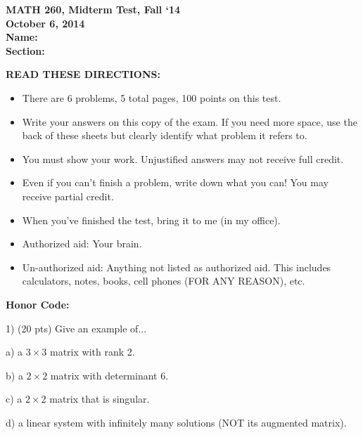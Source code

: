 \documentclass{article}
\begin{document}
\begin{flushleft}
	\bfseries{MATH 260, Midterm Test, Fall `14}\\
	\bfseries{October 6, 2014}\\
	\vspace{0.5in}
	\bfseries{Name:}\\
	\vspace{0.2in}
	\bfseries{Section:}\\
	\vspace{.5in}
	
	\bfseries{READ THESE DIRECTIONS:}
	\begin{itemize}
		\item{There are 6 problems, 5 total pages, 100 points on this test.}
		\item{Write your answers on this copy of the exam.   If you need more space, use the back of these sheets but clearly identify what problem it refers to.}
		\item{You must show your work.  Unjustified answers may not receive full credit.}
		\item{Even if you can't finish a problem, write down what you can!  You may receive partial credit.}
		\item{When you've finished the test, bring it to me (in my office).}
		\item{Authorized aid:  Your brain.}
		\item{Un-authorized aid:  Anything not listed as authorized aid.  This includes calculators, notes, books, cell phones (FOR ANY REASON), etc.}
	\end{itemize}

\vspace{1in}

\bfseries{Honor Code:}

\pagebreak

1) (20 pts) Give an example of...

\vspace{0.2in}

a) a $3 \times 3$ matrix with rank 2.

\vspace{1in}

b) a $2 \times 2$ matrix with determinant 6.

\vspace{1in}

c) a $2 \times 2$ matrix that is singular.

\vspace{1in}

d) a linear system with infinitely many solutions (NOT its augmented matrix).


\end{flushleft}
\end{document}
